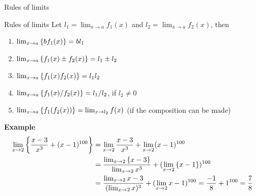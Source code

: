 \documentclass[9pt]{beamer}
\begin{document}
\begin{frame}{Rules of limits}

    \begin{block}{Rules of limits}
        Let $l_1 = \lim_{x\rightarrow a}f_1(x)$ and $l_2 = \lim_{x\rightarrow a}f_2(x)$, then
        \begin{enumerate}[leftmargin = 0.5cm, label = $\bullet$, rightmargin = 0.2cm]

            \item $\lim_{x\rightarrow a} \left\{ bf_1(x)\right\} = bl_1$
            
            \item $\lim_{x\rightarrow a} \left\{ f_1(x) \pm f_2(x)\right\} = l_1 \pm l_2$

            \item $\lim_{x\rightarrow a} \left\{ f_1(x)f_2(x)\right\} = l_1l_2$

            \item $\lim_{x\rightarrow a} \left\{ f_1(x)/f_2(x)\right\} = l_1/l_2$, if $l_2 \neq 0$
            
            \item $\lim_{x\rightarrow a} \left\{ f_1(f_2(x))\right\} = \lim_{x\rightarrow l_2}f(x)$ (if the composition can be made)
        \end{enumerate}
        
    \end{block}

    \textbf{Example}
        \begin{align*}
            \lim_{x\rightarrow 2}\left\{\frac{x - 3}{x^3} + (x - 1)^{100}\right\} &= \lim_{x\rightarrow 2}\frac{x - 3}{x^3} + \lim_{x\rightarrow 2}(x - 1)^{100} \\
            &= \frac{\lim_{x\rightarrow 2}\left\{ x - 3\right\}}{\lim_{x\rightarrow 2}x^3} + (\lim_{x\rightarrow 2}\left\{ x - 1\right\})^{100} \\
            &= \frac{\lim_{x\rightarrow 2}x - 3}{(\lim_{x\rightarrow 2}x)^3} + (\lim_{x\rightarrow 2} x - 1)^{100} = \frac{-1}{8} + 1^{100} = \frac{7}{8}
        \end{align*}       
    
\end{frame}
\end{document}
